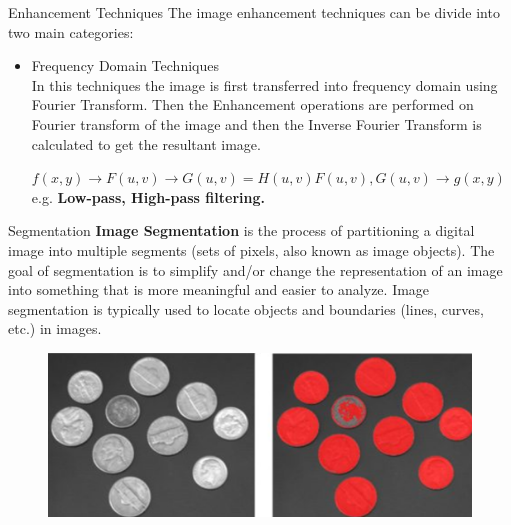 \documentclass[12pt]{beamer}
\begin{document}
\begin{frame}{Enhancement Techniques}
\large The image enhancement techniques can be divide into two main categories:
\normalsize
{}
 {
\begin{itemize}
\item<2> Frequency Domain Techniques \\
In this techniques the image is first transferred into frequency domain using Fourier Transform. Then the Enhancement operations are performed on Fourier transform of the image and then the Inverse Fourier Transform is calculated to get the resultant image.

$f(x,y) \rightarrow F(u,v) \rightarrow G(u,v) = H(u,v)F(u,v), G(u,v) \rightarrow g(x,y) $ \\
e.g. \textbf{Low-pass, High-pass filtering.}
\end{itemize}
}
\end{frame}
\begin{frame}{Segmentation}
\textbf{Image Segmentation}
 is the process of partitioning a digital image into multiple segments (sets of pixels, also known as image objects). The goal of segmentation is to simplify and/or change the representation of an image into something that is more meaningful and easier to analyze. Image segmentation is typically used to locate objects and boundaries (lines, curves, etc.) in images. 
 \begin{figure}[H]
 \begin{center}
 \includegraphics[scale=0.2]{coins.png}
 \end{center}
 \end{figure}
\end{frame}
\end{document}
